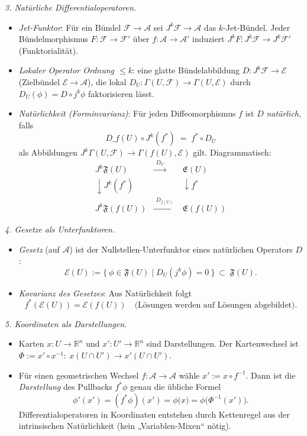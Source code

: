 \documentclass[10pt, letterpaper]{article}
\newcommand{\R}{\mathbb{R}}
\begin{document}
\bigskip
\emph{3. Natürliche Differentialoperatoren.}
\begin{itemize}
\item \emph{Jet-Funktor}: Für ein Bündel $\mathcal F\to\mathcal A$ sei $J^k\mathcal F\to\mathcal A$ das $k$-Jet-Bündel.
Jeder Bündelmorphismus $F:\mathcal F\to\mathcal F'$ über $f:\mathcal A\to\mathcal A'$ induziert
$J^kF:J^k\mathcal F\to J^k\mathcal F'$ (Funktorialität).
\item \emph{Lokaler Operator Ordnung $\le k$}:
eine glatte Bündelabbildung $D:J^k\mathcal F\to\mathcal E$ (Zielbündel $\mathcal E\to\mathcal A$), die lokal
$D_U:\Gamma(U,\mathcal F)\to\Gamma(U,\mathcal E)$ durch $D_U(\phi)=D\circ j^k\phi$ faktorisieren lässt.
\item \emph{Natürlichkeit (Forminvarianz)}:
Für jeden Diffeomorphismus $f$ ist $D$ \emph{natürlich}, falls
\[
\boxed{ \quad D\_{f(U)}\circ J^k(f^*) \;=\; f^*\circ D_U \quad }
\]
als Abbildungen $J^k\Gamma(U,\mathcal F)\to \Gamma(f(U),\mathcal E)$ gilt. Diagrammatisch:
\[
\begin{array}{ccc}
J^k\mathfrak F(U) & \xrightarrow{\ \ D_U\ \ } & \mathfrak E(U)\\[0.2em]
\downarrow J^k(f^*) & & \downarrow f^*\\[0.2em]
J^k\mathfrak F(f(U)) & \xrightarrow{\ \ D_{f(U)}\ \ } & \mathfrak E(f(U))
\end{array}
\]
\end{itemize}

\bigskip
\emph{4. Gesetze als Unterfunktoren.}
\begin{itemize}
\item \emph{Gesetz} (auf $\mathcal A$) ist der Nullstellen-Unterfunktor eines natürlichen Operators $D$:
\[
\mathcal E(U):=\{\ \phi\in\mathfrak F(U)\mid D_U(j^k\phi)=0\ \}\ \subset\ \mathfrak F(U).
\]
\item \emph{Kovarianz des Gesetzes}: Aus Natürlichkeit folgt
\[
f^*(\mathcal E(U))=\mathcal E(f(U)) \quad\text{(Lösungen werden auf Lösungen abgebildet).}
\]
\end{itemize}

\bigskip
\emph{5. Koordinaten als Darstellungen.}
\begin{itemize}
\item Karten $x:U\to\R^n$ und $x':U'\to\R^n$ sind Darstellungen. Der Kartenwechsel ist
$\Phi:=x'\circ x^{-1}:\ x(U\cap U')\to x'(U\cap U')$.
\item Für einen geometrischen Wechsel $f:\mathcal A\to\mathcal A$ wähle $x' := x\circ f^{-1}$.
Dann ist die \emph{Darstellung} des Pullbacks $f^*\phi$ genau die übliche Formel
\[
\phi'(x')=(f^*\phi)(x')=\phi\big(x\big)=\phi\big(\Phi^{-1}(x')\big).
\]
Differentialoperatoren in Koordinaten entstehen durch Kettenregel aus der intrinsischen
Natürlichkeit (kein „Variablen-Mixen“ nötig).
\end{itemize}
\end{document}
